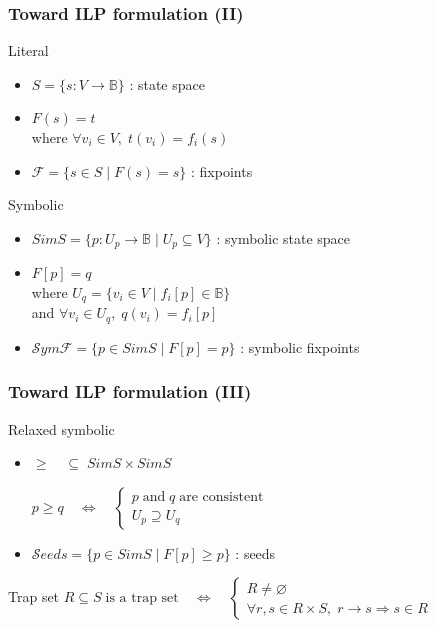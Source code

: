\documentclass{beamer}
\newcommand{\F}[0]{\mathcal{F}}
\newcommand{\SymF}[0]{\mathcal{S}ym\mathcal{F}}
\newcommand{\Seeds}[0]{\mathcal{S}eeds}
\begin{document}
\begin{frame}
  \frametitle{Toward ILP formulation (II)}
  \begin{block}{Literal}
    \begin{itemize}
    \item $ S = \{ s : V \rightarrow \mathbb{B} \} $ : state space
    \item $ F(s) = t $ \\
      where $ \forall v_i \in V, \; t(v_i) = f_i(s) $
    \item $ \F = \{ s \in S \mid F(s) = s \} $ : fixpoints
    \end{itemize}
  \end{block}
  \pause
  \begin{block}{Symbolic}
    \begin{itemize}
    \item $ SimS = \{ p : U_p \rightarrow \mathbb{B} \mid U_p \subseteq V \} $ : symbolic state space
    \item $ F[p] = q $ \\
      where $ U_q = \{v_i \in V \mid f_i[p] \in \mathbb{B} \} $ \\
      and $ \forall v_i \in U_q, \; q(v_i) = f_i[p] $
    \item $ \SymF = \{ p \in SimS \mid F[p] = p \} $ : symbolic fixpoints
    \end{itemize}
  \end{block}
\end{frame}

\begin{frame}
  \frametitle{Toward ILP formulation (III)}
  \begin{block}{Relaxed symbolic}
    \begin{itemize}
      \item $ \geq \quad \subseteq \; SimS \times SimS $ \\
        \begin{center}
          $ p \geq q \quad \Leftrightarrow \quad \begin{cases} p \; \text{and} \; q \; \text{are consistent} \\ U_p \supseteq U_q \end{cases} $
        \end{center}
      \item $ \Seeds = \{ p \in SimS \mid F[p] \geq p \} $ : seeds
    \end{itemize}
  \end{block}
  \pause
  \begin{block}{Trap set}
    $ R \subseteq S \; \text{is a trap set} \quad \Leftrightarrow \quad \begin{cases} R \neq \varnothing \\ \forall r, s \in R \times S, \; r \rightarrow s \Rightarrow s \in R \end{cases} $
  \end{block}
\end{frame}
\end{document}
